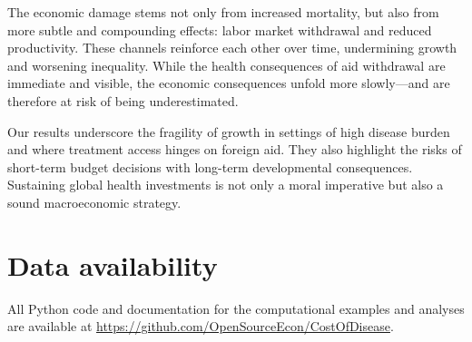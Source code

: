 \documentclass[letterpaper,12pt]{article}
\theoremstyle{definition}
\begin{document}
\begin{spacing}{1.5}
The economic damage stems not only from increased mortality, but also from more subtle and compounding effects: labor market withdrawal and reduced productivity. These channels reinforce each other over time, undermining growth and worsening inequality. While the health consequences of aid withdrawal are immediate and visible, the economic consequences unfold more slowly—and are therefore at risk of being underestimated.

Our results underscore the fragility of growth in settings of high disease burden and where treatment access hinges on foreign aid. They also highlight the risks of short-term budget decisions with long-term developmental consequences. Sustaining global health investments is not only a moral imperative but also a sound macroeconomic strategy.


\end{spacing}

\section*{Data availability}

All Python code and documentation for the computational examples and analyses are available at \href{https://github.com/OpenSourceEcon/CostOfDisease}{https://github.com/OpenSourceEcon/CostOfDisease}.

\end{document}
